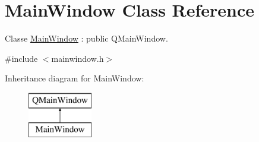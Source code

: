 \hypertarget{class_main_window}{\section{Main\-Window Class Reference}
\label{class_main_window}
}


Classe \hyperlink{class_main_window}{Main\-Window} \-: public Q\-Main\-Window.  




{\ttfamily \#include $<$mainwindow.\-h$>$}

Inheritance diagram for Main\-Window\-:\begin{figure}[H]
\begin{center}
\leavevmode
\includegraphics[height=2.000000cm]{class_main_window}
\end{center}
\end{figure}
